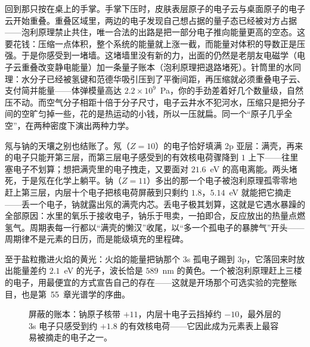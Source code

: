 
回到那只按在桌上的手掌。手掌下压时，皮肤表层原子的电子云与桌面原子的电子云开始重叠。重叠区域里，两边的电子发现自己想占据的量子态已经被对方占据——泡利原理禁止共住，唯一合法的出路是把一部分电子推向能量更高的空态。这要花钱：压缩一点体积，整个系统的能量就上涨一截，而能量对体积的导数正是压强。于是你感受到一堵墙。这堵墙里没有新的力，出面的仍然是老朋友电磁学（电子云重叠改变静电能量）加一条量子账本（泡利原理把退路堵死）。针筒里的水同理：水分子已经被氢键和范德华吸引压到了平衡间距，再压缩就必须重叠电子云、支付简并能量——体弹模量高达 \(2.2\times10^{9}\)~Pa，你的手劲差着好几个数量级，自然压不动。而空气分子相距十倍于分子尺寸，电子云井水不犯河水，压缩只是把分子间的空旷匀掉一些，花的是热运动的小钱，所以一压就扁。同一个“原子几乎全空”，在两种密度下演出两种力学。

氖与钠的天壤之别也结账了。氖（\(Z=10\)）的电子恰好填满 2p 亚层：满壳，再来的电子只能开第三层，而第三层电子感受到的有效核电荷骤降到 \(1\) 上下——往里塞电子不划算；想把满壳里的电子拽走，又要面对 \(21.6\)~eV 的高电离能。两头堵死，于是氖在化学上躺平。钠（\(Z=11\)）多出的那一个电子被泡利原理孤零零地赶上第三层，内层十个电子把核电荷屏蔽到只剩约 \(1.8\)，\(5.14\)~eV 就能把它摘走——丢一个电子，钠就露出氖的满壳内芯。丢电子极其划算，这就是它遇水暴躁的全部原因：水里的氧乐于接收电子，钠乐于甩卖，一拍即合，反应放出的热量点燃氢气。周期表每一行都以“满壳的懒汉”收尾，以“多一个孤电子的暴脾气”开头——周期律不是元素的日历，而是能级填充的里程碑。

至于盐粒撒进火焰的黄光：火焰的能量把钠那个 3s 孤电子踢到 3p，它落回来时放出能量差约 \(2.1\)~eV 的光子，波长恰是 \(589\)~nm 的黄色。一个被泡利原理赶上三楼的电子，用最便宜的方式宣告自己的存在——这就是开场那个可选实验的完整账目，也是第~55~章光谱学的序曲。

\begin{figure}[htbp]
\centering
{}
\caption{屏蔽的账本：钠原子核带 \(+11\)，内层十电子云挡掉约 \(-10\)，最外层的 3s 电子只感受到约 \(+1.8\) 的有效核电荷——它因此成为元素表上最容易被摘走的电子之一。}
\end{figure}

